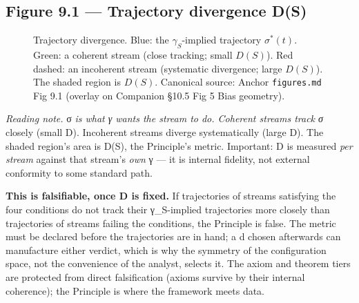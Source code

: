 \documentclass[11pt, openany]{book}
\begin{document}
\subsection{Figure 9.1 --- Trajectory divergence D(S)}

\begin{figure}[H]
\centering
{}
\caption{Trajectory divergence. Blue: the $\gamma_S$-implied trajectory $\sigma^*(t)$. Green: a coherent stream (close tracking; small $D(S)$). Red dashed: an incoherent stream (systematic divergence; large $D(S)$). The shaded region is $D(S)$. Canonical source: Anchor \texttt{figures.md} Fig 9.1 (overlay on Companion \S10.5 Fig 5 Bias geometry).}
\label{fig:anchor-trajectory-divergence}
\end{figure}

\textit{Reading note.} σ\textit{ is what γ wants the stream to do. Coherent streams track σ} closely (small D). Incoherent streams diverge systematically (large D). The shaded region's area is D(S), the Principle's metric. Important: D is measured \textit{per stream} against that stream's \textit{own} γ --- it is internal fidelity, not external conformity to some standard path.

\textbf{This is falsifiable, once D is fixed.} If trajectories of streams satisfying the four conditions do not track their γ\_\allowbreak{}S-implied trajectories more closely than trajectories of streams failing the conditions, the Principle is false. The metric must be declared before the trajectories are in hand; a d chosen afterwards can manufacture either verdict, which is why the symmetry of the configuration space, not the convenience of the analyst, selects it. The axiom and theorem tiers are protected from direct falsification (axioms survive by their internal coherence); the Principle is where the framework meets data.
\end{document}
